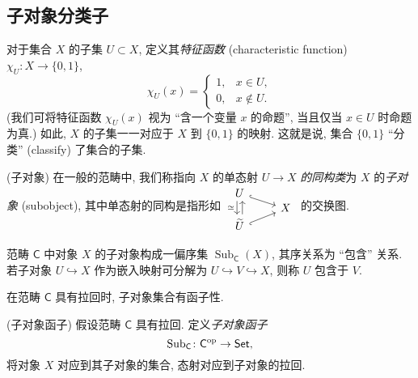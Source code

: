 \subsection{子对象分类子}

对于集合 $X$ 的子集 $U\subset X$,
定义其\emph{特征函数} (characteristic function) $\chi_U \colon X \to \{0,1\}$,
$$
\chi_U(x) = \begin{cases}
    1, & x\in U,\\
    0, & x\notin U.
\end{cases}
$$
(我们可将特征函数 $\chi_U(x)$ 视为 ``含一个变量 $x$ 的命题'', 当且仅当 $x\in U$ 时命题为真.)
如此, $X$ 的子集一一对应于 $X$ 到 $\{0,1\}$ 的映射.
这就是说, 集合 $\{0,1\}$ ``分类'' (classify) 了集合的子集.

\begin{definition}
    {(子对象)}
    在一般的范畴中, 我们称指向 $X$ 的单态射 $U \to X$ \emph{的同构类}为 $X$ 的\emph{子对象} (subobject), 其中单态射的同构是指形如
    $\begin{tikzcd}[ampersand replacement=\&,row sep=-1pt]
    	U \\
    	\& X \\
    	{\widetilde U}
    	\arrow[hook, from=1-1, to=2-2]
    	\arrow[hook', from=3-1, to=2-2]
    	\arrow["\simeq"', shift right=1, from=1-1, to=3-1]
    	\arrow[shift right=1, from=3-1, to=1-1]
    \end{tikzcd}$
    的交换图.
\end{definition}



范畴 $\mathsf C$ 中对象 $X$ 的子对象构成一偏序集 $\operatorname{Sub}_{\mathsf C}(X)$, 其序关系为 ``包含'' 关系. 若子对象 $U\hookrightarrow X$ 作为嵌入映射可分解为 $U\hookrightarrow V \hookrightarrow X$, 则称 $U$ 包含于 $V$.

在范畴 $\mathsf C$ 具有拉回时, 子对象集合有函子性.

\begin{definition}{(子对象函子)}
    假设范畴 $\mathsf C$ 具有拉回. 定义\emph{子对象函子}
    $$\operatorname{Sub}_{\mathsf C} \colon \mathsf C^{\text{op}} \to \mathsf {Set},$$
    将对象 $X$ 对应到其子对象的集合,
    态射对应到子对象的拉回.
\end{definition}

